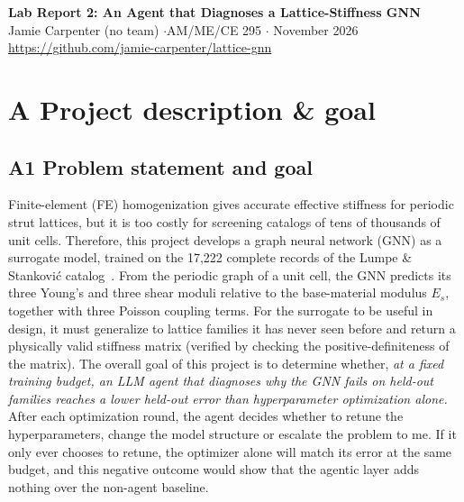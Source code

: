 \documentclass[11pt]{article}
\begin{document}
\begin{center}
  {\Large\bfseries Lab Report 2: An Agent that Diagnoses a Lattice-Stiffness GNN}\\[0.5ex]
  Jamie Carpenter (no team) \quad$\cdot$\quad AM/ME/CE 295 \quad$\cdot$ November 2026\\
  \url{https://github.com/jamie-carpenter/lattice-gnn}
\end{center}

\section*{A \quad Project description \& goal}

\subsection*{A1 \quad Problem statement and goal}
Finite-element (FE) homogenization gives accurate effective stiffness for periodic strut lattices,
but it is too costly for screening catalogs of tens of thousands of unit cells. Therefore,
this project develops a graph neural network (GNN) as a surrogate model, trained on the 17,222
complete records of the Lumpe \& Stankovi\'c catalog~\cite{lumpe}. From the periodic graph of a
unit cell, the GNN predicts its three Young's and three shear moduli relative to the base-material
modulus $E_s$, together with three Poisson coupling terms. For the surrogate to be useful in
design, it must generalize to lattice families it has never seen before and return a physically
valid stiffness matrix (verified by checking the positive-definiteness of the matrix). The overall
goal of this project is to determine whether, \emph{at a fixed training budget, an LLM agent that
diagnoses why the GNN fails on held-out families reaches a lower held-out error than
hyperparameter optimization alone.} After each optimization round, the agent decides whether to
retune the hyperparameters, change the model structure or escalate the problem to me. If it only
ever chooses to retune, the optimizer alone will match its error at the same budget, and this
negative outcome would show that the agentic layer adds nothing over the non-agent baseline.
\end{document}
